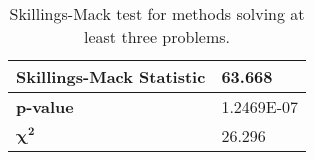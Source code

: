 \begin{table}[h]
\begin{center}
\begin{tabular}{ | P{3.0cm} | P{3.0cm} | }
    \hline
    
    \rule{0pt}{3ex}    
    \textbf{Skillings-Mack Statistic} & 63.668 \\[1em]

    \hline

    \rule{0pt}{3ex}    
    \textbf{p-value} & 1.2469E-07 \\[1em]

    \hline

    \rule{0pt}{3ex}    
    $\bm{\chi^2}$ & 26.296 \\[1em]

    \hline

    \end{tabular}
    \end{center}
    \vspace*{-4mm}
    \caption{Skillings-Mack test for methods solving at least three problems. \\[1em]}
    \label{tab:SkillMack_3}
\end{table}